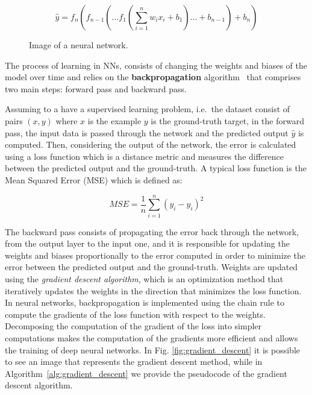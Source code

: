\begin{equation}
    \hat{y} = f_n(f_{n-1}(\dots f_1(\sum_{i=1}^{n} w_i x_i + b_1) \dots + b_{n-1}) + b_n)
    \label{eq:nn}
\end{equation}


\begin{figure}[ht]
    \begin{center}
        \fbox{\rule[-.5cm]{0cm}{4cm} \rule[-.5cm]{4cm}{0cm}}
    \end{center}
    \caption{Image of a neural network.}
    \label{fig:nn}
\end{figure}


The process of learning in NNs, consists of changing the weights and biases of the model over time and relies on the \textbf{backpropagation} algorithm~\citep{rumelhart1986learning} that comprises two main steps: forward pass and backward pass.

Assuming to a have a supervised learning problem, i.e.\ the dataset consist of pairs $(x,y)$ where
$x$ is the example $y$ is the ground-truth target, in the forward pass, the input data is passed through the network and the predicted output $\hat{y}$ is computed.
Then, considering the output of the network, the error is calculated using a loss function which is a distance metric and measures the difference between the predicted output and the ground-truth.
A typical loss function is the Mean Squared Error (MSE) which is defined as:

\begin{equation}
    MSE = \frac{1}{n} \sum_{i=1}^{n} (y_i - \hat{y}_i)^2
\end{equation}

The backward pass consists of propagating the error back through the network, from the output layer to the input one, and it is responsible for updating the weights and biases proportionally to the error computed in order to minimize the error between the predicted output and the ground-truth.
Weights are updated using the \textit{gradient descent algorithm}, which is an optimization method that iteratively updates the weights in the direction that minimizes the loss function.
In neural networks, backpropagation is implemented using the chain rule to compute the gradients of the loss function with respect to the weights. 
Decomposing the computation of the gradient of the loss into simpler computations makes the computation of the gradients more efficient and allows the training of deep neural networks.
In Fig. \ref{fig:gradient_descent} it is possible to see an image that represents the gradient descent method, while in Algorithm~\ref{alg:gradient_descent} we provide the pseudocode of the gradient descent algorithm.

